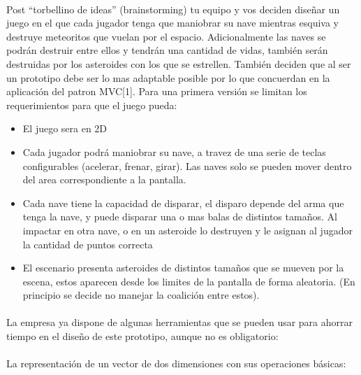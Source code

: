 \documentclass[a4paper,10pt]{extarticle}
\begin{document}
        \paragraph{}
        Post “torbellino de ideas” (brainstorming) tu equipo y vos deciden diseñar un
        juego en el que cada jugador tenga que maniobrar su nave mientras esquiva y
        destruye meteoritos que vuelan por el espacio. Adicionalmente las naves se
        podrán destruir entre ellos y tendrán una cantidad de vidas, también serán
        destruidas por los asteroides con los que se estrellen. También deciden que al ser
        un prototipo debe ser lo mas adaptable posible por lo que concuerdan en la
        aplicación del patron MVC[1]. Para una primera versión se limitan los
        requerimientos para que el juego pueda:
        \begin{itemize}
            \item El juego sera en 2D
            \item Cada jugador podrá maniobrar su nave, a travez de una serie de teclas
            configurables (acelerar, frenar, girar). Las naves solo se pueden mover dentro
            del area correspondiente a la pantalla.
            \item Cada nave tiene la capacidad de disparar, el disparo depende del arma que
            tenga la nave, y puede disparar una o mas balas de distintos tamaños. Al
            impactar en otra nave, o en un asteroide lo destruyen y le asignan al jugador
            la cantidad de puntos correcta
            \item El escenario presenta asteroides de distintos tamaños que se mueven por la
            escena, estos aparecen desde los limites de la pantalla de forma aleatoria. (En
            principio se decide no manejar la coalición entre estos).
        \end{itemize}

        \paragraph{}
        La empresa ya dispone de algunas herramientas que se pueden usar para
        ahorrar tiempo en el diseño de este prototipo, aunque no es obligatorio:

        \paragraph{}
        La representación de un vector de dos dimensiones con sus operaciones básicas:
\end{document}
